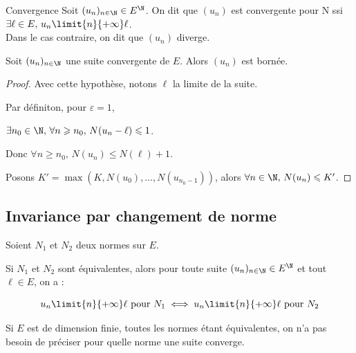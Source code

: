 \begin{definitionnt}{Convergence}{}
    Soit $(u_n)_{n \in \N} \in E^{\N}$. On dit que $(u_n)$ est convergente pour N ssi 
    $\exists \ell \in E, \, u_n \limit{n}{+\infty} \ell$. \\

    Dans le cas contraire, on dit que $(u_n)$ diverge.
\end{definitionnt}

\begin{definitionnt}{}{}
    Soit $(u_n)_{n \in \N}$ une suite convergente de $E$. Alors $(u_n)$ est bornée.
\end{definitionnt}


\begin{proof}
    Avec cette hypothèse, notons $\ell$ la limite de la suite. 

    Par définiton, pour $\varepsilon = 1$,
    
    $\exists n_0 \in \N, \, \forall n \geqslant n_0, \, N(u_n - \ell) \leqslant 1$.

    Donc $\forall n \geqslant n_0, \, N(u_n) \leqslant N(\ell) + 1$.

    Posons $K' = \max(K, N(u_0), \ldots, N(u_{n_0 - 1}))$, alors $\forall n \in \N, \, N(u_n) \leqslant K'$.
\end{proof}

\subsection{Invariance par changement de norme}

\begin{theorement}{}{}
    Soient $N_1$ et $N_2$ deux normes sur $E$. 

    Si $N_1$ et $N_2$ sont équivalentes, alors pour toute suite $(u_n)_{n \in \N} \in E^{\N}$ 
    et tout $\ell \in E$, on a :

    $$ u_n \limit{n}{+\infty} \ell \text{ pour } N_1 \iff u_n \limit{n}{+\infty} \ell \text{ pour } N_2 $$
\end{theorement}

\begin{remarque}
    Si $E$ est de dimension finie, toutes les normes étant équivalentes, on n'a pas besoin de préciser pour quelle norme une suite converge.
\end{remarque}


